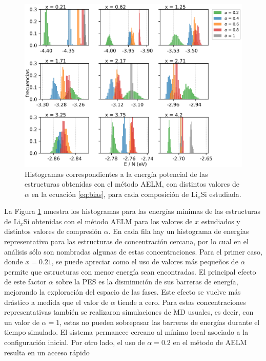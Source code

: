 \begin{figure}[h]
    \centering
    \includegraphics[width=\textwidth]{Silicio/caracterizacion/resultados/introduccion/energias.png}
    \caption{Histogramas correspondientes a la energía potencial de las 
    estructuras obtenidas con el método AELM, con distintos valores de $\alpha$
    en la ecuación \ref{eq:bias}, para cada composición de Li$_x$Si estudiada.}
    \label{fig:energias}
\end{figure}
La Figura \ref{fig:energias} muestra los histogramas para las energías mínimas
de las estructuras de Li$_x$Si obtenidas con el método AELM para los valores de
$x$ estudiados y distintos valores de compresión $\alpha$. En cada fila hay un 
histograma de energías representativo para las estructuras de concentración 
cercana, por lo cual en el análisis sólo son nombradas algunas de estas 
concentraciones. Para el primer caso, donde $x = 0.21$, se puede apreciar como el 
uso de valores más pequeños de $\alpha$ permite que estructuras con menor energía 
sean encontradas. El principal efecto de este factor $\alpha$ sobre la PES es la 
disminución de sus barreras de energía, mejorando la exploración del espacio de 
las fases. Este efecto se vuelve más drástico a medida que el valor de $\alpha$ 
tiende a cero. Para estas concentraciones representativas también se realizaron 
simulaciones de MD usuales, es decir, con un valor de $\alpha = 1$, estas no 
pueden sobrepasar las barreras de energías durante el tiempo simulado. El sistema 
permanece cercano al mínimo local asociado a la configuración inicial. Por otro 
lado, el uso de $\alpha = 0.2$ en el método de AELM resulta en un acceso rápido
